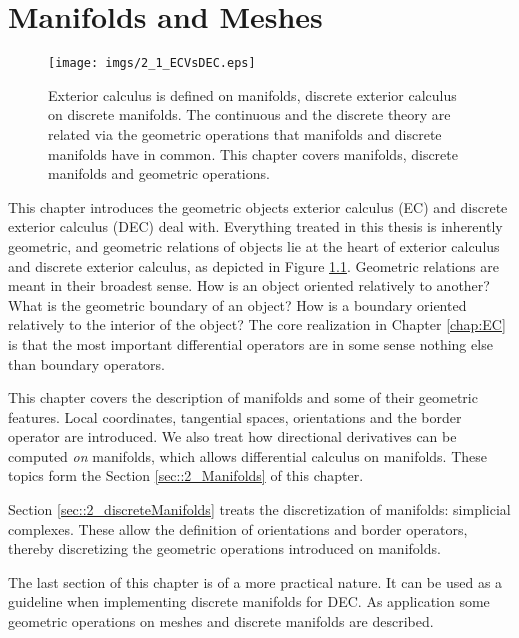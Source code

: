 \chapter{Manifolds and Meshes}
\label{chap:mfs_and_mshs}

\begin{figure}[h]
\begin{center}
\texttt{[image: imgs/2\_1\_ECVsDEC.eps]}
\end{center}
\vspace{-0.5cm}
\caption{Exterior calculus is defined on manifolds, discrete exterior calculus on discrete manifolds. The continuous and the discrete theory are related via the geometric operations that manifolds and discrete manifolds have in common.  This chapter covers manifolds, discrete manifolds and geometric operations.}
\label{fig:2_ECVvsDEC}
\end{figure}


This chapter introduces the geometric objects exterior calculus (EC) and discrete exterior calculus (DEC) deal with. Everything treated in this thesis is inherently geometric, and geometric relations of objects lie at the heart of exterior calculus and discrete exterior calculus, as depicted in Figure \ref{fig:2_ECVvsDEC}. Geometric relations are meant in their broadest sense. How is an object oriented relatively to another? What is the geometric boundary of an object? How is a boundary oriented relatively to the interior of the object? The core realization in Chapter \ref{chap:EC} is that the most important differential operators are in some sense nothing else than boundary operators. 


This chapter covers the description of manifolds and some of their geometric features. Local coordinates, tangential spaces, orientations and the border operator are introduced. We also treat how directional derivatives can be computed \emph{on} manifolds, which allows differential calculus on manifolds. These topics form the Section \ref{sec::2_Manifolds} of this chapter.

Section \ref{sec::2_discreteManifolds} treats the discretization of manifolds: simplicial complexes. These allow the definition of orientations and border operators, thereby discretizing the geometric operations introduced on manifolds.

The last section of this chapter is of a more practical nature. It can be used as a guideline when implementing discrete manifolds for DEC. As application some geometric operations on meshes and discrete manifolds are described.

